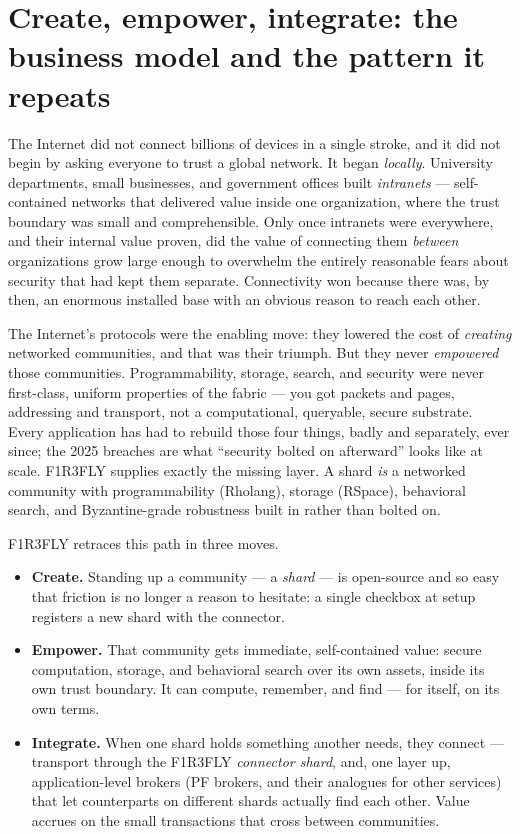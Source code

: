 \documentclass[11pt]{article}
\begin{document}
\section{Create, empower, integrate: the business model and the pattern it repeats}\label{sec:model}

The Internet did not connect billions of devices in a single stroke, and it did not begin by asking everyone to trust a global network. It began \emph{locally}. University departments, small businesses, and government offices built \emph{intranets} --- self-contained networks that delivered value inside one organization, where the trust boundary was small and comprehensible. Only once intranets were everywhere, and their internal value proven, did the value of connecting them \emph{between} organizations grow large enough to overwhelm the entirely reasonable fears about security that had kept them separate. Connectivity won because there was, by then, an enormous installed base with an obvious reason to reach each other.

The Internet's protocols were the enabling move: they lowered the cost of \emph{creating} networked communities, and that was their triumph. But they never \emph{empowered} those communities. Programmability, storage, search, and security were never first-class, uniform properties of the fabric --- you got packets and pages, addressing and transport, not a computational, queryable, secure substrate. Every application has had to rebuild those four things, badly and separately, ever since; the 2025 breaches are what ``security bolted on afterward'' looks like at scale. F1R3FLY supplies exactly the missing layer. A shard \emph{is} a networked community with programmability (Rholang), storage (RSpace), behavioral search, and Byzantine-grade robustness built in rather than bolted on.

\begin{keybox}
F1R3FLY retraces this path in three moves.
\begin{itemize}[leftmargin=1.2em, itemsep=3pt, topsep=2pt]
  \item \textbf{Create.} Standing up a community --- a \emph{shard} --- is open-source and so easy that friction is no longer a reason to hesitate: a single checkbox at setup registers a new shard with the connector.
  \item \textbf{Empower.} That community gets immediate, self-contained value: secure computation, storage, and behavioral search over its own assets, inside its own trust boundary. It can compute, remember, and find --- for itself, on its own terms.
  \item \textbf{Integrate.} When one shard holds something another needs, they connect --- transport through the F1R3FLY \emph{connector shard}, and, one layer up, application-level brokers (PF brokers, and their analogues for other services) that let counterparts on different shards actually find each other. Value accrues on the small transactions that cross between communities.
\end{itemize}
\end{keybox}
\end{document}
